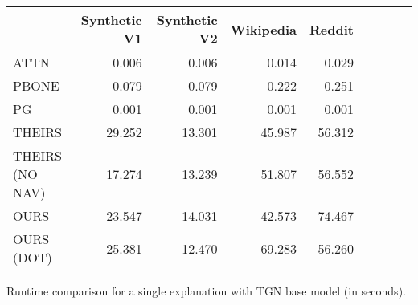 \begin{tabular}{lrrrrrrrr}
\toprule
 & Synthetic V1 & Synthetic V2 & Wikipedia & Reddit \\
\midrule
ATTN & 0.006 & 0.006 & 0.014 & 0.029 \\
PBONE & 0.079 & 0.079 & 0.222 & 0.251 \\
PG & 0.001 & 0.001 & 0.001 & 0.001 \\
THEIRS & 29.252 & 13.301 & 45.987 & 56.312 \\
THEIRS (NO NAV) & 17.274 & 13.239 & 51.807 & 56.552 \\
OURS & 23.547 & 14.031 & 42.573 & 74.467 \\
OURS (DOT) & 25.381 & 12.470 & 69.283 & 56.260 \\
\bottomrule
\end{tabular}
\caption{\label{tab:tgn_runtime_single}Runtime comparison for a single explanation with TGN base model (in seconds).}
